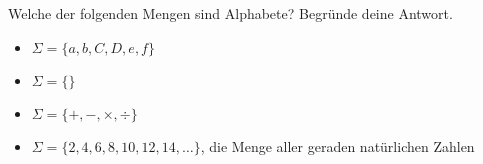 %
%
Welche der folgenden Mengen sind Alphabete? Begründe deine Antwort.
\begin{itemize}[label=$\square$]
    \item \(\Sigma = \{a, b, C, D, e, f\}\)
    \item \(\Sigma = \{\}\)
    \item \(\Sigma = \{+, -, \times, \div\}\)
    \item \(\Sigma = \{2, 4, 6, 8, 10, 12, 14, \dots\}\), die Menge aller geraden natürlichen Zahlen
\end{itemize}
